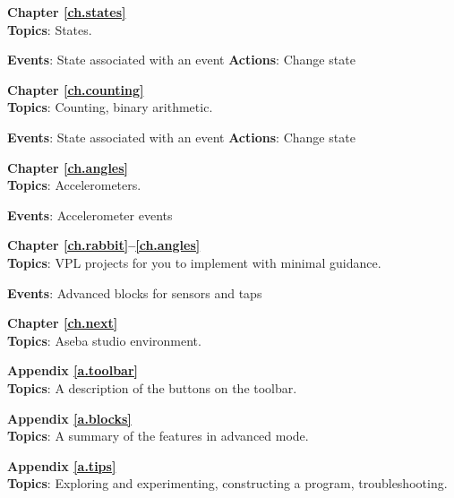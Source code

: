  \hfill {}

\bigskip

{\centering \textbf{Chapter \ref{ch.states}}\\}
\textbf{Topics}: States.

\textbf{Events}: State associated with an event \hfill \textbf{Actions}:
Change state

 \hfill {}

\bigskip

{\centering \textbf{Chapter \ref{ch.counting}}\\}
\textbf{Topics}: Counting, binary arithmetic.

\textbf{Events}: State associated with an event \hfill \textbf{Actions}:
Change state

 \hfill {}

\bigskip

{\centering \textbf{Chapter \ref{ch.angles}}\\}
\textbf{Topics}: Accelerometers.

\textbf{Events}: Accelerometer events

 \quad {}

\bigskip

{\centering \textbf{Chapter \ref{ch.rabbit}--\ref{ch.angles}}\\}
\textbf{Topics}: VPL projects for you to implement with minimal
guidance.

\textbf{Events}: Advanced blocks for sensors and taps

 \quad {}
\quad {}


\bigskip

{\centering \textbf{Chapter \ref{ch.next}}\\}
\textbf{Topics}: Aseba studio environment.

\newpage

{\centering \textbf{Appendix \ref{a.toolbar}}\\}
\textbf{Topics}: A description of the buttons on the toolbar.

\bigskip

{\centering \textbf{Appendix \ref{a.blocks}}\\}
\textbf{Topics}: A summary of the features in advanced mode.

\bigskip
{\centering \textbf{Appendix \ref{a.tips}}\\}
\textbf{Topics}: Exploring and experimenting,
constructing a program, troubleshooting.

